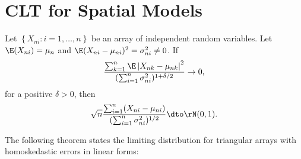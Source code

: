 \documentclass[english,12pt]{book}\usepackage[]{graphicx}\usepackage[]{xcolor}
\begin{document}
\section{CLT for Spatial Models}

\begin{theorem}
Let $\left\lbrace X_{ni}: i = 1, \ldots, n\right\rbrace$ be an array of independent random variables. Let $\E(X_{ni}) = \mu_n$ and $\E(X_{ni} - \mu_{ni})^2 = \sigma_{ni}^2\neq 0$. If
\begin{equation*}
\frac{\sum_{k = 1}^n\E\left|X_{nk}- \mu_{nk}\right|^2}{(\sum_{i= 1}^n \sigma^2_{ni})^{1 + \delta/2}}\to 0,
\end{equation*}
%
for a positive $\delta >0$, then
\begin{equation*}
\sqrt{n}\frac{\sum_{i = 1}^n(X_{ni}-\mu_{ni})}{(\sum_{i = 1}^n \sigma^2_{ni})^{1/2}}\dto \rN(0,1).
\end{equation*}
\end{theorem}

The following theorem states the limiting distribution for triangular arrays with homoskedastic errors in linear forms:
\end{document}
